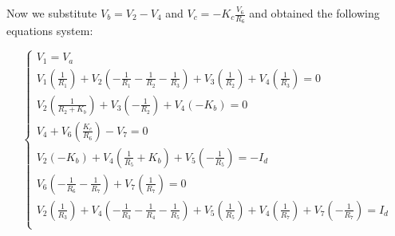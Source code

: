 Now we substitute $V_b=V_2-V_4$ and $V_c=-K_c\frac{V_6}{R_6}$ and obtained the following equations system:

\begin{equation}
\begin{cases}
V_1=V_a\\
V_1(\frac{1}{R_1})+V_2(-\frac{1}{R_1}-\frac{1}{R_2}-\frac{1}{R_3})+V_3(\frac{1}{R_2})+V_4(\frac{1}{R_3})=0\\
V_2(\frac{1}{R_2+K_b})+V_3(-\frac{1}{R_2})+V_4(-K_b)=0\\
V_4+ V_6(\frac{K_c}{R_6})- V_7= 0\\
V_2(-K_b)+V_4(\frac{1}{R_5}+K_b)+V_5(-\frac{1}{R_5})= -I_d\\
V_6(-\frac{1}{R_6}-\frac{1}{R_7})+V_7(\frac{1}{R_7})= 0\\
V_2(\frac{1}{R_3})+V_4(-\frac{1}{R_3}-\frac{1}{R_4}-\frac{1}{R_5})+V_5(\frac{1}{R_5})+V_4(\frac{1}{R_7})+V_7(-\frac{1}{R_7})=I_d\\
\end{cases}
\end{equation}

